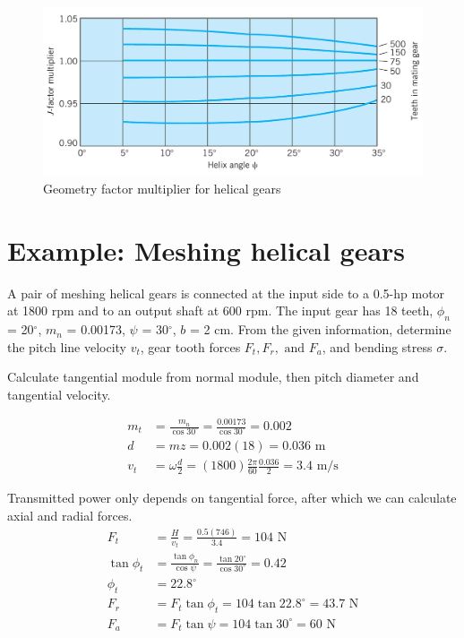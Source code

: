 \documentclass[a4paper,openany]{tufte-book}
\begin{document}
\begin{figure}[htbp]
\centering
\includegraphics[width=.9\linewidth]{./pictures/Gears/geometry-factor-multiplier-helical.png}
\caption{\label{fig: factor multiplier}Geometry factor multiplier for helical gears}
\end{figure}

\section{Example: Meshing helical gears}
\label{sec:orgd459cc2}

A pair of meshing helical gears is connected at the input side to a 0.5-hp motor at 1800 rpm and to an output shaft at 600 rpm. The input gear has 18 teeth, \(\phi_{n}\) = 20\(^{\circ}\), \(m_{n}\) = 0.00173, \(\psi\) = 30\(^{\circ}\), \(b\) = 2 cm. From the given information, determine the pitch line velocity \(v_{t}\), gear tooth forces \(F_{t}, F_{r}, \text{ and } F_{a}\), and bending stress \(\sigma\).

Calculate tangential module from normal module, then pitch diameter and tangential velocity.

\begin{align*}
  m_{t} &= \frac{m_{n}}{\cos 30^{\circ}} = \frac{0.00173}{\cos 30^{\circ}} = 0.002 \\
  d &= mz = 0.002(18) = 0.036 \text{ m} \\
  v_{t} &= \omega \frac{d}{2}  = (1800) \frac{2\pi}{60} \frac{0.036}{2} = 3.4 \text{ m/s}
\end{align*}

Transmitted power only depends on tangential force, after which we can calculate axial and radial forces.
\begin{align*}
  F_{t} &= \frac{H}{v_{t}} = \frac{0.5(746)}{3.4} = 104 \text{ N} \\
  \tan \phi_{t} &= \frac{\tan \phi_{n}}{\cos \psi} = \frac{\tan 20^{\circ}}{\cos 30^{\circ}} = 0.42 \\
  \phi_{t} &= 22.8^{\circ} \\
  F_{r} &= F_{t}\tan \phi_{t} = 104 \tan 22.8^{\circ} = 43.7 \text{ N} \\
  F_{a} &= F_{t} \tan \psi = 104 \tan 30^{\circ} = 60 \text{ N}
\end{align*}
\end{document}
